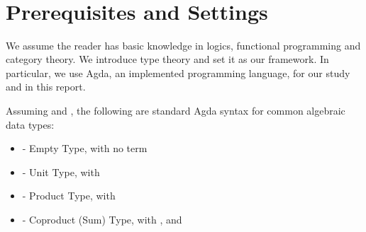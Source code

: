 \begin{code}[hide]%
\>[0]\AgdaSpace{}%
\AgdaSpace{}%
\<%
\\
\>[0]\AgdaSpace{}%
\AgdaSpace{}%
\<%
\\
\>[0]\AgdaSpace{}%
\AgdaSpace{}%
\<%
\\
%
\\[\AgdaEmptyExtraSkip]%
\>[0]\AgdaSpace{}%
\AgdaSymbol{:}\AgdaSpace{}%
\<%
\\
\>[0]\AgdaSpace{}%
\AgdaSymbol{=}\AgdaSpace{}%
\<%
\\
%
\\[\AgdaEmptyExtraSkip]%
\>[0]\AgdaSpace{}%
\AgdaSymbol{:}\AgdaSpace{}%
\<%
\\
\>[0]\AgdaSpace{}%
\AgdaSymbol{=}\AgdaSpace{}%
\<%
\\
%
\\[\AgdaEmptyExtraSkip]%
\>[0]\AgdaSpace{}%
\AgdaSpace{}%
\<%
\\
\>[0]%
\>[7]\AgdaSpace{}%
\<%
\end{code}

\chapter{Prerequisites and Settings}

We assume the reader has basic knowledge in logics, functional programming and category theory. We introduce type theory and set it as our framework. In particular, we use Agda, an implemented programming language, for our study and in this report.

Assuming  \AgdaSymbol{:}  and  \AgdaSymbol{:} , the following are standard Agda syntax for common algebraic data types:

\begin{itemize}
  \item{ - Empty Type, with no term}
  \item{ - Unit Type, with  \AgdaSymbol{:} }
  \item{ - Product Type, with  \AgdaInductiveConstructor{,}  \AgdaSymbol{:}   }
  \item{ - Coproduct (Sum) Type, with   \AgdaSymbol{:}   , and   \AgdaSymbol{:}   }
\end{itemize}

